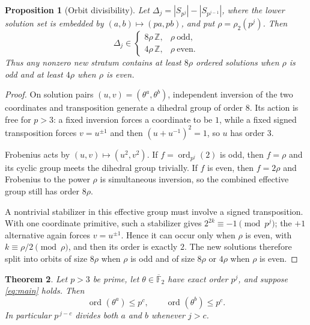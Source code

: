 \documentclass[a4paper]{article}
\newtheorem{theorem}{Theorem}[section]
\newtheorem{proposition}[theorem]{Proposition}
\newcommand{\F}{\mathbb{F}}
\newcommand{\Z}{\mathbb{Z}}
\newcommand{\ord}[2][]{\operatorname{ord}_{#1}\!\left(#2\right)}
\newcommand{\abs}[1]{\left|#1\right|}
\begin{document}
\begin{proposition}[Orbit divisibility]\label{prop:orbit-divisibility}
	Let $\Delta_j=\abs{S_{p^j}}-\abs{S_{p^{j-1}}}$, where the lower solution
	set is embedded by $(a,b)\mapsto(pa,pb)$, and put
	$\rho=\rho_2(p^j)$. Then
	\[
		\Delta_j\in
		\begin{cases}
			8\rho\,\Z,&\rho\ \text{odd},\\
			4\rho\,\Z,&\rho\ \text{even}.
		\end{cases}
	\]
	Thus any nonzero new stratum contains at least $8\rho$ ordered solutions
	when $\rho$ is odd and at least $4\rho$ when $\rho$ is even.
\end{proposition}

\begin{proof}
	On solution pairs $(u,v)=(\theta^a,\theta^b)$, independent inversion of
	the two coordinates and transposition generate a dihedral group of order
	$8$. Its action is free for $p>3$: a fixed inversion forces a coordinate
	to be $1$, while a fixed signed transposition forces $v=u^{\pm1}$ and
	then $(u+u^{-1})^2=1$, so $u$ has order $3$.

	Frobenius acts by $(u,v)\mapsto(u^2,v^2)$. If
	$f=\ord[p^j]{2}$ is odd, then $f=\rho$ and its cyclic group meets the
	dihedral group trivially. If $f$ is even, then $f=2\rho$ and
	Frobenius to the power $\rho$ is simultaneous inversion, so the combined
	effective group still has order $8\rho$.

	A nontrivial stabilizer in this effective group must involve a signed
	transposition. With one coordinate primitive, such a stabilizer gives
	$2^{2k}\equiv-1\pmod{p^j}$; the $+1$ alternative again forces
	$v=u^{\pm1}$. Hence it can occur only when $\rho$ is even, with
	$k\equiv\rho/2\pmod\rho$, and then its order is exactly $2$.
	The new solutions therefore split into orbits of size $8\rho$ when
	$\rho$ is odd and of size $8\rho$ or $4\rho$ when $\rho$ is even.
\end{proof}

\begin{theorem}\label{thm:A}
	Let $p>3$ be prime, let $\theta\in\overline{\F}_2$ have exact order
	$p^j$, and suppose \eqref{eq:main} holds.
	Then
	\[
		\ord{\theta^{a}}\leq p^{c},
		\qquad
		\ord{\theta^{b}}\leq p^{c}.
	\]
	In particular $p^{\,j-c}$ divides both $a$ and $b$ whenever $j>c$.
\end{theorem}
\end{document}
